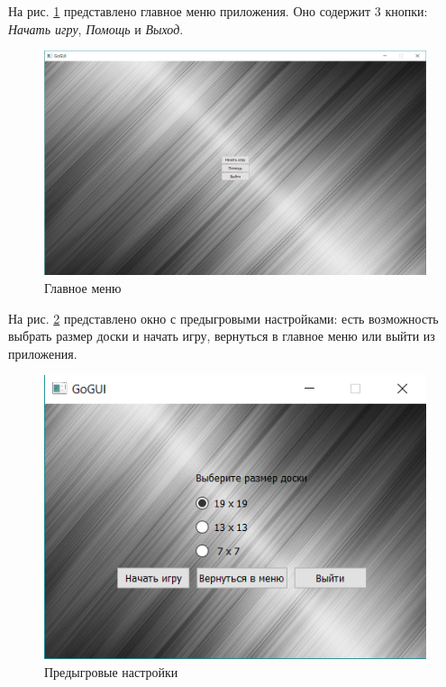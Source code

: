На рис. \ref{pic:GUI_Menu} представлено главное меню приложения. Оно содержит 3 кнопки: \textit{Начать игру}, \textit{Помощь} и \textit{Выход}.

\begin{figure}[H]
	\begin{center}
		\includegraphics[scale=0.5]{pics/GoGUI/Menu.png}
	    \caption{Главное меню} 
		\label{pic:GUI_Menu}
	\end{center}
\end{figure}

На рис. \ref{pic:GUI_Settings} представлено окно с предыгровыми настройками: есть возможность выбрать размер доски и начать игру, вернуться в главное меню или выйти из приложения.

\begin{figure}[H]
	\begin{center}
		\includegraphics[scale=0.6]{pics/GoGUI/Settings.png}
	    \caption{Предыгровые настройки} 
		\label{pic:GUI_Settings}
	\end{center}
\end{figure}

